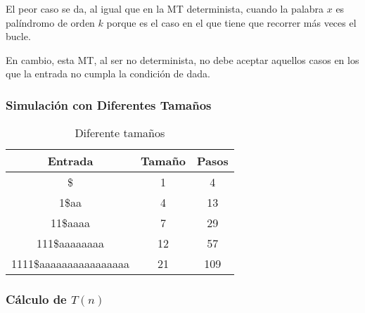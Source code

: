 \documentclass{uc3mpracticas}
\begin{document}
  El peor caso se da, al igual que en la MT determinista, cuando la palabra $x$ es palíndromo de orden $k$ porque es el caso en el que tiene que recorrer más veces el bucle.

  \vspace{3mm}

  En cambio, esta MT, al ser no determinista, no debe aceptar aquellos casos en los que la entrada no cumpla la condición de dada.

\newpage

\subsubsection{Simulación con Diferentes Tamaños}

  \begin{table}[!h]
    \centering
  \begin{tabular}{|c|c|c|}
  \hline
  \textbf{Entrada}       & \textbf{Tamaño} & \textbf{Pasos} \\ \hline
  \$            & 1               & 4              \\ \hline
  1\$aa         & 4               & 13             \\ \hline
  11\$aaaa      & 7               & 29             \\ \hline
  111\$aaaaaaaa          & 12              & 57             \\ \hline
  1111\$aaaaaaaaaaaaaaaa & 21              & 109            \\ \hline
  \end{tabular}
  \caption{Diferente tamaños}
  \end{table}


\subsubsection{Cálculo de $T(n)$}
\end{document}
